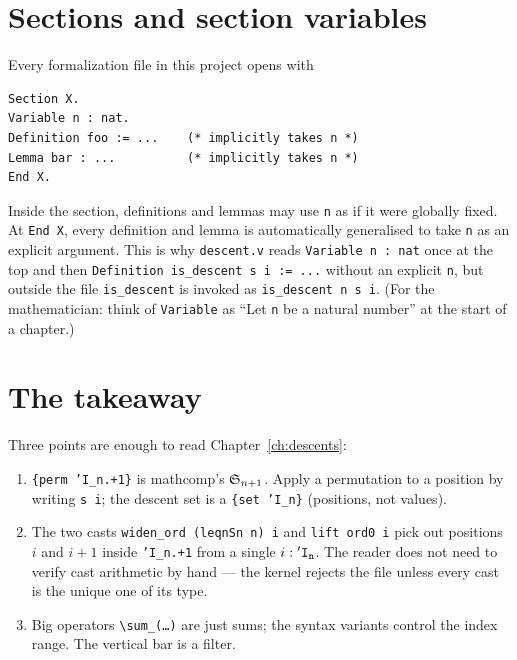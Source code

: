 \section{Sections and section variables}

Every formalization file in this project opens with

\begin{lstlisting}[language=Rocq]
Section X.
Variable n : nat.
Definition foo := ...    (* implicitly takes n *)
Lemma bar : ...          (* implicitly takes n *)
End X.
\end{lstlisting}

\noindent Inside the section, definitions and lemmas may use
\texttt{n} as if it were globally fixed. At \texttt{End X}, every
definition and lemma is automatically generalised to take \texttt{n}
as an explicit argument. This is why \texttt{descent.v} reads
\texttt{Variable n : nat} once at the top and then
\texttt{Definition is\_descent s i := ...} without an explicit
\texttt{n}, but outside the file \texttt{is\_descent} is invoked as
\texttt{is\_descent n s i}. (For the mathematician: think of
\texttt{Variable} as ``Let \texttt{n} be a natural number'' at the
start of a chapter.)

\section{The takeaway}

Three points are enough to read Chapter~\ref{ch:descents}:

\begin{enumerate}
  \item \texttt{\{perm 'I\_n.+1\}} is mathcomp's $\mathfrak{S}_{n+1}$. Apply
    a permutation to a position by writing \texttt{s i}; the descent
    set is a \texttt{\{set 'I\_n\}} (positions, not values).
  \item The two casts \texttt{widen\_ord (leqnSn n) i} and
    \texttt{lift ord0 i} pick out positions $i$ and $i+1$ inside
    \texttt{'I\_n.+1} from a single $i : \mathtt{'I_{n}}$. The reader does
    not need to verify cast arithmetic by hand --- the kernel
    rejects the file unless every cast is the unique one of its
    type.
  \item Big operators \texttt{\textbackslash sum\_(\ldots)} are
    just sums; the syntax variants control the index range. The
    vertical bar is a filter.
\end{enumerate}

